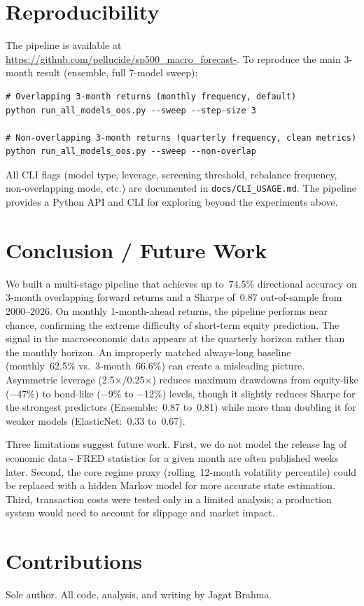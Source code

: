 \documentclass{article}
\begin{document}
\section{Reproducibility}

The pipeline is available at \url{https://github.com/pellucide/sp500\_macro\_forecast-}.
To reproduce the main 3-month result (ensemble, full 7-model sweep):

\begin{verbatim}
# Overlapping 3-month returns (monthly frequency, default)
python run_all_models_oos.py --sweep --step-size 3

# Non-overlapping 3-month returns (quarterly frequency, clean metrics)
python run_all_models_oos.py --sweep --non-overlap
\end{verbatim}

All CLI flags (model type, leverage, screening threshold, rebalance frequency,
non-overlapping mode, etc.) are documented in \texttt{docs/CLI\_USAGE.md}. The
pipeline provides a Python API and CLI for exploring beyond the experiments above.


\section{Conclusion / Future Work}

We built a multi-stage pipeline that achieves up to~74.5\% directional
accuracy on 3-month overlapping forward returns and a Sharpe of~0.87
out-of-sample from 2000--2026. On monthly 1-month-ahead returns, the
pipeline performs near chance, confirming the extreme difficulty of
short-term equity prediction. The signal in the macroeconomic data
appears at the quarterly horizon rather than the monthly horizon. An
improperly matched always-long baseline (monthly~62.5\% vs.\ 3-month~66.6\%)
can create a misleading picture. Asymmetric leverage (2.5$\times$/0.25$\times$)
reduces maximum drawdowns from equity-like ($-$47\%) to bond-like ($-$9\% to
$-$12\%) levels, though it slightly reduces Sharpe for the strongest
predictors (Ensemble:~0.87 to~0.81) while more than doubling it for
weaker models (ElasticNet:~0.33 to~0.67).

Three limitations suggest future work. First, we do not model the release lag
of economic data - FRED statistics for a given month are often published
weeks later. Second, the core regime proxy (rolling~12-month volatility
percentile) could be replaced with a hidden Markov model for more accurate
state estimation. Third, transaction costs were tested only in a limited
analysis; a production system would need to account for slippage and market
impact.

\vspace{2em}

\section{Contributions}
Sole author. All code, analysis, and writing by Jagat Brahma.



\end{document}
